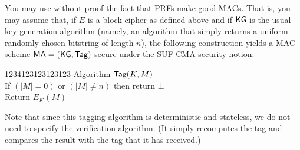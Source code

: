 \documentclass{exam}
\begin{document}
\noindent You may use without proof the fact that PRFs make good MACs. That is, you may assume that, if $E$ is a block cipher as defined above and if $\mathsf{KG}$ is the usual key generation algorithm (namely, an algorithm that simply returns a uniform randomly chosen bitstring of length $n$), the following construction yields a MAC scheme $\mathsf{MA} = (\mathsf{KG},\mathsf{Tag})$ secure under the SUF-CMA security notion.
  \begin{tabbing}
    1234\=123\=123\=123\=123\=\kill
    Algorithm $\mathsf{Tag}(K,M)$ \\
    \> If $(|M| = 0)$ or $(|M| \neq n)$ then return $\bot$ \\
    \> Return $E_K(M)$
  \end{tabbing}
  Note that since this tagging algorithm is deterministic and stateless, we do not need to specify the verification algorithm. (It simply recomputes the tag and compares the result with the tag that it has received.)

  \newpage
  
\end{document}
